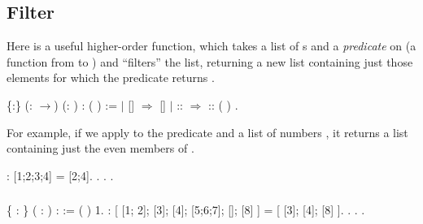 \documentclass[12pt]{report}
\begin{document}
\subsection{Filter}



 Here is a useful higher-order function, which takes a list
    of s and a \textit{predicate} on  (a function from  to )
    and ``filters'' the list, returning a new list containing just those
    elements for which the predicate returns . \begin{coqdoccode}
\coqdocemptyline
\coqdocnoindent
{}  \{:\} (: \ensuremath{\rightarrow}) (: )\coqdoceol
\coqdocindent{8.00em}
: ( ) :=\coqdoceol
\coqdocindent{1.00em}
  \coqdoceol
\coqdocindent{1.00em}
\ensuremath{|} []     \ensuremath{\Rightarrow} []\coqdoceol
\coqdocindent{1.00em}
\ensuremath{|}  ::  \ensuremath{\Rightarrow}      :: (  )\coqdoceol
\coqdocindent{12.00em}
         \coqdoceol
\coqdocindent{1.00em}
.\coqdoceol
\coqdocemptyline
\end{coqdoccode}
For example, if we apply  to the predicate 
    and a list of numbers , it returns a list containing just the
    even members of . \begin{coqdoccode}
\coqdocemptyline
\coqdocnoindent
{} :   [1;2;3;4] = [2;4].\coqdoceol
\coqdocnoindent
{}. . .\coqdoceol
\coqdocemptyline
\end{coqdoccode}
\subsubsection{ }

\begin{coqdoccode}
\coqdocnoindent
{}  \{ : \} ( :  ) :  :=\coqdoceol
\coqdocindent{1.00em}
 ( ) 1.\coqdoceol
\coqdocemptyline
\coqdocnoindent
{} :\coqdoceol
\coqdocindent{2.00em}
 \coqdoceol
\coqdocindent{5.50em}
[ [1; 2]; [3]; [4]; [5;6;7]; []; [8] ]\coqdoceol
\coqdocindent{1.00em}
= [ [3]; [4]; [8] ].\coqdoceol
\coqdocnoindent
{}. . .\coqdoceol
\coqdocemptyline
\end{coqdoccode}
\end{document}
